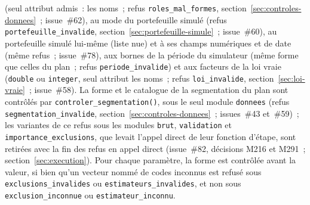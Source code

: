 \documentclass[a4paper,11pt]{article}
\newcommand{\code}[1]{\texttt{\small #1}}
\begin{document}
(seul attribut admis~: les noms~; refus \code{roles\_mal\_formes},
section~\ref{sec:controles-donnees}~; issue~\#62), au mode du portefeuille
simulé (refus \code{portefeuille\_invalide},
section~\ref{sec:portefeuille-simule}~; issue~\#60), au portefeuille simulé
lui-même (liste nue) et à ses champs numériques et de date (même refus~;
issue~\#78), aux bornes de la
période du simulateur (même forme que celles du plan~; refus
\code{periode\_invalide}) et aux facteurs de la loi vraie (\code{double} ou
\code{integer}, seul attribut les noms~; refus \code{loi\_invalide},
section~\ref{sec:loi-vraie}~; issue~\#58). La forme et le catalogue de
la segmentation du plan sont contrôlés par \code{controler\_segmentation()},
sous le seul module \code{donnees} (refus \code{segmentation\_invalide},
section~\ref{sec:controles-donnees}~; issues~\#43 et~\#59)~; les variantes
de ce refus sous les modules \code{brut}, \code{validation} et
\code{importance\_exclusions}, que levait l'appel direct de leur fonction
d'étape, sont retirées avec la fin des refus en appel direct (issue~\#82,
décisions M216 et M291~; section~\ref{sec:execution}). Pour
chaque paramètre, la forme est contrôlée avant la valeur, si bien qu'un vecteur nommé de codes inconnus est
refusé sous \code{exclusions\_invalides} ou \code{estimateurs\_invalides},
et non sous \code{exclusion\_inconnue} ou \code{estimateur\_inconnu}.
\end{document}
